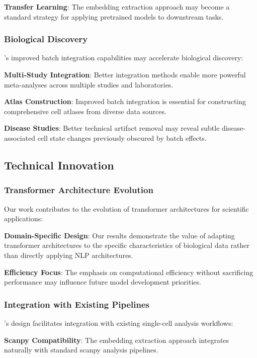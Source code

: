 \textbf{Transfer Learning}: The embedding extraction approach may become a standard strategy for applying pretrained models to downstream tasks.

\subsubsection{Biological Discovery}

\bioformer{}'s improved batch integration capabilities may accelerate biological discovery:

\textbf{Multi-Study Integration}: Better integration methods enable more powerful meta-analyses across multiple studies and laboratories.

\textbf{Atlas Construction}: Improved batch integration is essential for constructing comprehensive cell atlases from diverse data sources.

\textbf{Disease Studies}: Better technical artifact removal may reveal subtle disease-associated cell state changes previously obscured by batch effects.

\subsection{Technical Innovation}

\subsubsection{Transformer Architecture Evolution}

Our work contributes to the evolution of transformer architectures for scientific applications:

\textbf{Domain-Specific Design}: Our results demonstrate the value of adapting transformer architectures to the specific characteristics of biological data rather than directly applying NLP architectures.

\textbf{Efficiency Focus}: The emphasis on computational efficiency without sacrificing performance may influence future model development priorities.

\subsubsection{Integration with Existing Pipelines}

\bioformer{}'s design facilitates integration with existing single-cell analysis workflows:

\textbf{Scanpy Compatibility}: The embedding extraction approach integrates naturally with standard scanpy analysis pipelines.

